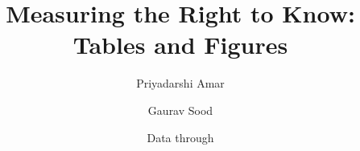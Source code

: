 \documentclass[11pt]{article}
\title{Measuring the Right to Know: Tables and Figures}
\author{Priyadarshi Amar \and Gaurav Sood}
\date{Data through \rtiasof{}}
\begin{document}
\maketitle

\FloatBarrier

\FloatBarrier

\FloatBarrier

\FloatBarrier

\FloatBarrier

\FloatBarrier

\FloatBarrier

\FloatBarrier

\FloatBarrier

\FloatBarrier

\FloatBarrier

\FloatBarrier

\FloatBarrier

\FloatBarrier

\FloatBarrier

\FloatBarrier

\FloatBarrier

\FloatBarrier

\FloatBarrier

\FloatBarrier
\end{document}
